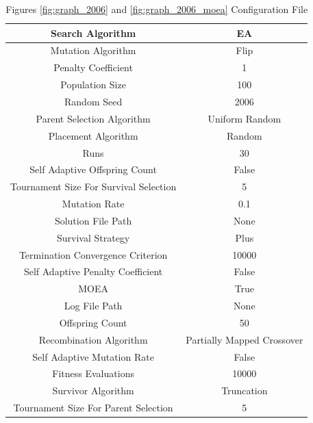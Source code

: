 \documentclass{standalone}
\begin{document}
\clearpage
\begin{table}[!htb]
	\centering
	\caption{Figures \ref{fig:graph_2006} and \ref{fig:graph_2006_moea} Configuration File}
	\label{tab:graph_2006}
	\begin{tabular}{| c | c |}
		\hline
		Search Algorithm		& EA		 \\
		\hline
		Mutation Algorithm		& Flip		 \\
		\hline
		Penalty Coefficient		& 1		 \\
		\hline
		Population Size		& 100		 \\
		\hline
		Random Seed		& 2006		 \\
		\hline
		Parent Selection Algorithm		& Uniform Random		 \\
		\hline
		Placement Algorithm		& Random		 \\
		\hline
		Runs		& 30		 \\
		\hline
		Self Adaptive Offspring Count		& False		 \\
		\hline
		Tournament Size For Survival Selection		& 5		 \\
		\hline
		Mutation Rate		& 0.1		 \\
		\hline
		Solution File Path		& None		 \\
		\hline
		Survival Strategy		& Plus		 \\
		\hline
		Termination Convergence Criterion		& 10000		 \\
		\hline
		Self Adaptive Penalty Coefficient		& False		 \\
		\hline
		MOEA		& True		 \\
		\hline
		Log File Path		& None		 \\
		\hline
		Offspring Count		& 50		 \\
		\hline
		Recombination Algorithm		& Partially Mapped Crossover		 \\
		\hline
		Self Adaptive Mutation Rate		& False		 \\
		\hline
		Fitness Evaluations		& 10000		 \\
		\hline
		Survivor Algorithm		& Truncation		 \\
		\hline
		Tournament Size For Parent Selection		& 5		 \\
		\hline
	\end{tabular}
\end{table}
\end{document}
